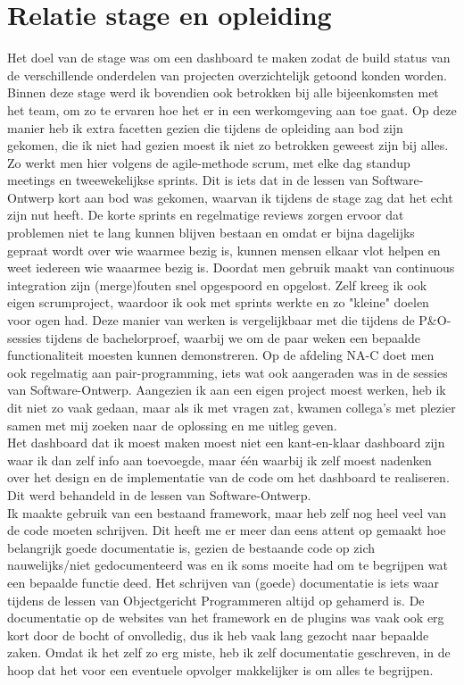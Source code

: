 \documentclass[10pt,a4paper]{article}
\begin{document}
\section{Relatie stage en opleiding}
\label{relatie}
Het doel van de stage was om een dashboard te maken zodat de build status van de verschillende onderdelen van projecten overzichtelijk getoond konden worden. Binnen deze stage werd ik bovendien ook betrokken bij alle bijeenkomsten met het team, om zo te ervaren hoe het er in een werkomgeving aan toe gaat. Op deze manier heb ik extra facetten gezien die tijdens de opleiding aan bod zijn gekomen, die ik niet had gezien moest ik niet zo betrokken geweest zijn bij alles. Zo werkt men hier volgens de agile-methode scrum, met elke dag standup meetings en tweewekelijkse sprints. Dit is iets dat in de lessen van Software-Ontwerp kort aan bod was gekomen, waarvan ik tijdens de stage zag dat het echt zijn nut heeft. De korte sprints en regelmatige reviews zorgen ervoor dat problemen niet te lang kunnen blijven bestaan en omdat er bijna dagelijks gepraat wordt over wie waarmee bezig is, kunnen mensen elkaar vlot helpen en weet iedereen wie waaarmee bezig is. Doordat men gebruik maakt van continuous integration zijn (merge)fouten snel opgespoord en opgelost. Zelf kreeg ik ook eigen scrumproject, waardoor ik ook met sprints werkte en zo "kleine" doelen voor ogen had. Deze manier van werken is vergelijkbaar met die tijdens de P\&O-sessies tijdens de bachelorproef, waarbij we om de paar weken een bepaalde functionaliteit moesten kunnen demonstreren. Op de afdeling NA-C doet men ook regelmatig aan pair-programming, iets wat ook aangeraden was in de sessies van Software-Ontwerp. Aangezien ik aan een eigen project moest werken, heb ik dit niet zo vaak gedaan, maar als ik met vragen zat, kwamen collega's met plezier samen met mij zoeken naar de oplossing en me uitleg geven.\\
Het dashboard dat ik moest maken moest niet een kant-en-klaar dashboard zijn waar ik dan zelf info aan toevoegde, maar \'e\'en waarbij ik zelf moest nadenken over het design en de implementatie van de code om het dashboard te realiseren. Dit werd behandeld in de lessen van Software-Ontwerp.\\
Ik maakte gebruik van een bestaand framework, maar heb zelf nog heel veel van de code moeten schrijven. Dit heeft me er meer dan eens attent op gemaakt hoe belangrijk goede documentatie is, gezien de bestaande code op zich nauwelijks/niet gedocumenteerd was en ik soms moeite had om te begrijpen wat een bepaalde functie deed. Het schrijven van (goede) documentatie is iets waar tijdens de lessen van Objectgericht Programmeren altijd op gehamerd is. De documentatie op de websites van het framework en de plugins  was vaak ook erg kort door de bocht of onvolledig, dus ik heb vaak lang gezocht naar bepaalde zaken. Omdat ik het zelf zo erg miste, heb ik zelf documentatie geschreven, in de hoop dat het voor een eventuele opvolger makkelijker is om alles te begrijpen.\\
\end{document}

